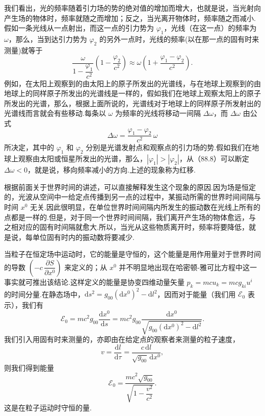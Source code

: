 我们看出，光的频率随着引力场的势的绝对值的增加而增大，也就是说，当光射向产生场的物体时，频率就随之而增加；反之，当光离开物体时，频率随之而减小.假如一条光线从一点射出，而这一点的引力势为 $\varphi_1$，光线（在这一点）的频率为 $\omega$，那么，当到达引力势为 $\varphi_2$ 的另外一点时，光线的频率(以在那一点的固有时来测量)就等于
\begin{equation*}
  \frac{\omega}{1-\dfrac{\varphi_1}{c^2}}
  \left(1-\frac{\varphi_2}{c^2}\right)
  \approx\omega\left(1+\frac{\varphi_1-\varphi_2}{c^2}\right).
\end{equation*}
例如，在太阳上观察到的由太阳上的原子所发出的光谱线，与在地球上观察到的由地球上的同样原子所发出的光谱线是一样的，假如我们在地球上观察太阳上的原子所发出的光谱，那么，根据上面所说的，光谱线对于地球上的同样原子所发射出的光谱线而言就会有些移动.每条以 $\omega$ 为频率的光线将移动一间隔 $\Delta\omega$，而 $\Delta\omega$ 由公式
\begin{equation}
  \Delta\omega=\frac{\varphi_1-\varphi_2}{c^2}\,\omega
\end{equation}
所决定，其中的 $\varphi_1$ 和 $\varphi_2$ 分别是光谱发射点和观察点的引力场的势.假如我们在地球上观察由太阳或恒星所发出的光谱，那么，$\left|\varphi_1\right|>\left|\varphi_2\right|$，从（88.8）可以断定 $\Delta\omega<0$，就是说，移向频率减小的方向.上述的现象称为红移.

根据前面关于世界时间的讲述，可以直接解释发生这个现象的原因.因为场是恒定的，光波从空间中一给定点传播到另一点的过程中，某振动所需的世界时间间隔与时间 $x^0$ 无关.因此很明显，在单位世界时间间隔内所发生的振动数在光线上所有的点都是一样的.但是，对于同一个世界时间间隔，我们离开产生场的物体愈远，与之相对应的固有时间隔就愈大.所以，当光从这些物质离开时，频率将要降低，就是说，每单位固有时内的振动数将要减少.

当粒子在恒定场中运动时，它的能量是守恒的，这个能量是用作用量对于世界时间的导数 $\left(-c\,\dfrac{\partial S}{\partial x^0}\right)$ 来定义的；从 $x^0$ 并不明显地出现在哈密顿-雅可比方程中这一事实就可推出该结论.这样定义的能量是协变四维动量矢量 $p_k=mcu_k=mcg_{ki}u^i$ 的时间分量.在静态场中，$\mathrm{d}s^2=g_{00}(\mathrm{d}x^0)^2-\mathrm{d}l^2$，因而对于能量（我们用 $\mathcal{E}_0$ 表示），我们有
\begin{equation*}
  \mathcal{E}_0=mc^2g_{00}\frac{\mathrm{d}x^0}{\mathrm{d}s}
  =mc^2g_{00}\frac{\mathrm{d}x^0}
  {\sqrt{g_{00}(\mathrm{d}x^0)^2-\mathrm{d}l^2}}.
\end{equation*}
我们引入用固有时来测量的，亦即由在给定点的观察者来测量的粒子速度，
\begin{equation*}
  v=\frac{\mathrm{d}l}{\mathrm{d}\tau}
  =\frac{c\,\mathrm{d}l}{\sqrt{g_{00}}\,\mathrm{d}x^0},
\end{equation*}
则我们得到能量
\begin{equation}
  \mathcal{E}_0=\frac{mc^2\sqrt{g_{00}}}
  {\sqrt{1-\dfrac{v^2}{c^2}}}.
\end{equation}
这是在粒子运动时守恒的量.

